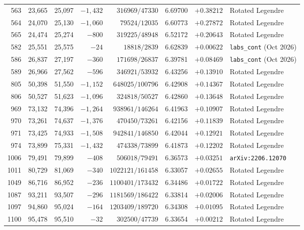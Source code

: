 \documentclass[10.5pt,letterpaper]{article}
\begin{document}
\begin{table}[t]
\begin{tabular}{rrrrrlll}
563 & 23,665 & 25,097 & $-1{,}432$ & $316969/47330$ & 6.69700 & $+0.38212$ & Rotated Legendre \\
564 & 24,070 & 25,130 & $-1{,}060$ & $79524/12035$ & 6.60773 & $+0.27872$ & Rotated Legendre \\
565 & 24,474 & 25,274 & $-800$ & $319225/48948$ & 6.52172 & $+0.20643$ & Rotated Legendre \\
582 & 25,551 & 25,575 & $-24$ & $18818/2839$ & 6.62839 & $+0.00622$ & \texttt{labs\_cont} (Oct 2026) \\
586 & 26,837 & 27,197 & $-360$ & $171698/26837$ & 6.39781 & $+0.08469$ & \texttt{labs\_cont} (Oct 2026) \\
589 & 26,966 & 27,562 & $-596$ & $346921/53932$ & 6.43256 & $+0.13910$ & Rotated Legendre \\
805 & 50,398 & 51,550 & $-1{,}152$ & $648025/100796$ & 6.42908 & $+0.14367$ & Rotated Legendre \\
806 & 50,527 & 51,623 & $-1{,}096$ & $324818/50527$ & 6.42860 & $+0.13648$ & Rotated Legendre \\
969 & 73,132 & 74,396 & $-1{,}264$ & $938961/146264$ & 6.41963 & $+0.10907$ & Rotated Legendre \\
970 & 73,261 & 74,637 & $-1{,}376$ & $470450/73261$ & 6.42156 & $+0.11839$ & Rotated Legendre \\
971 & 73,425 & 74,933 & $-1{,}508$ & $942841/146850$ & 6.42044 & $+0.12921$ & Rotated Legendre \\
974 & 73,899 & 75,331 & $-1{,}432$ & $474338/73899$ & 6.41873 & $+0.12202$ & Rotated Legendre \\
1006 & 79,491 & 79,899 & $-408$ & $506018/79491$ & 6.36573 & $+0.03251$ & \texttt{arXiv:2206.12070} \\
1011 & 80,729 & 81,069 & $-340$ & $1022121/161458$ & 6.33057 & $+0.02655$ & Rotated Legendre \\
1049 & 86,716 & 86,952 & $-236$ & $1100401/173432$ & 6.34486 & $+0.01722$ & Rotated Legendre \\
1087 & 93,211 & 93,507 & $-296$ & $1181569/186422$ & 6.33814 & $+0.02006$ & Rotated Legendre \\
1097 & 94,860 & 95,024 & $-164$ & $1203409/189720$ & 6.34308 & $+0.01095$ & Rotated Legendre \\
1100 & 95,478 & 95,510 & $-32$ & $302500/47739$ & 6.33654 & $+0.00212$ & Rotated Legendre \\
\bottomrule
\end{tabular}
\end{table}
\end{document}
